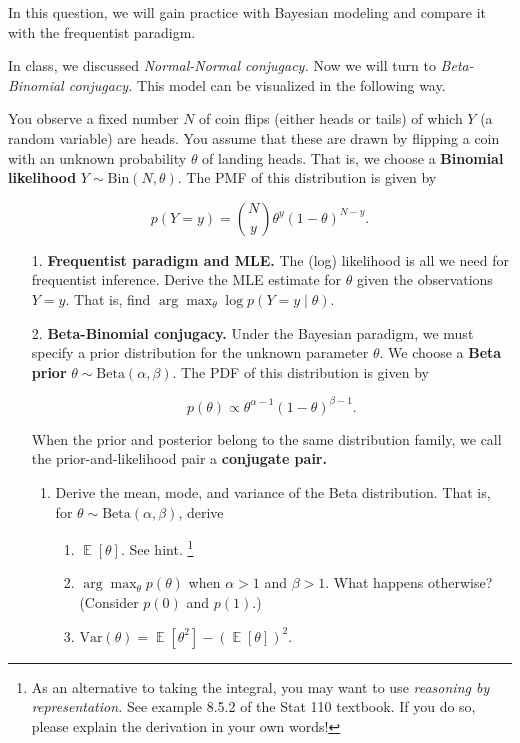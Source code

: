\documentclass[submit]{harvardml}
\DeclareMathOperator*{\mean}{\mathbb{E}}
\begin{document}
\begin{problem}
  
  In this question, we will gain practice with Bayesian modeling and
  compare it with the frequentist paradigm.
  
  In class, we discussed \emph{Normal-Normal conjugacy.} Now
  we will turn to \emph{Beta-Binomial conjugacy.} This model can be
  visualized in the following way.
  
  You observe a fixed number \(N\) of coin flips (either
  heads or tails) of which \(Y\) (a random variable) are heads. You assume that these are
  drawn by flipping a coin with an unknown probability \(\theta\) of
  landing heads. That is, we choose a \textbf{Binomial likelihood}
  \(Y \sim \mathrm{Bin}(N, \theta)\). The PMF of this distribution is
  given by
  
  \[
  p(Y=y) = {N \choose y} \theta^{y} (1-\theta)^{N-y}.
  \]
  
  \begin{enumerate}
  \item[1.]
    \textbf{Frequentist paradigm and MLE.} The (log) likelihood is all we
    need for frequentist inference. Derive the MLE estimate for \(\theta\)
    given the observations \(Y = y\). That is, find
    \(\arg \max_{\theta} \log p(Y = y \mid \theta)\).
  
  \item[2.]
    \textbf{Beta-Binomial conjugacy.} Under the Bayesian paradigm, we must specify a
    prior distribution for the unknown parameter \(\theta\). We choose a \textbf{Beta prior}
    \(\theta \sim \mathrm{Beta}(\alpha, \beta)\). The PDF of this
    distribution is given by
    
    \[
    p(\theta) \propto \theta^{\alpha - 1} (1-\theta)^{\beta - 1}.
    \]
    
    When the prior and posterior belong to the same distribution family, we
    call the prior-and-likelihood pair a \textbf{conjugate pair.}
    
    \begin{enumerate}
      \item Derive the mean, mode, and variance of the Beta distribution. That is, for $\theta \sim \mathrm{Beta}(\alpha, \beta)$, derive
      
      \begin{enumerate}
        \item $\mean[\theta]$. See hint. \footnote{As an alternative to taking the integral, you may want to use
        \emph{reasoning by representation.} See example 8.5.2 of the Stat 110
        textbook. If you do so, please explain the derivation in your own
        words!}
        \item $\arg \max_{\theta} p(\theta)$ when $\alpha > 1$ and $\beta > 1$. What happens otherwise? (Consider $p(0)$ and $p(1)$.)
        \item $\mathrm{Var}(\theta) = \mean[\theta^2] - (\mean[\theta])^2$.
      \end{enumerate}


\end{enumerate}
\end{enumerate}
\end{problem}
\end{document}
